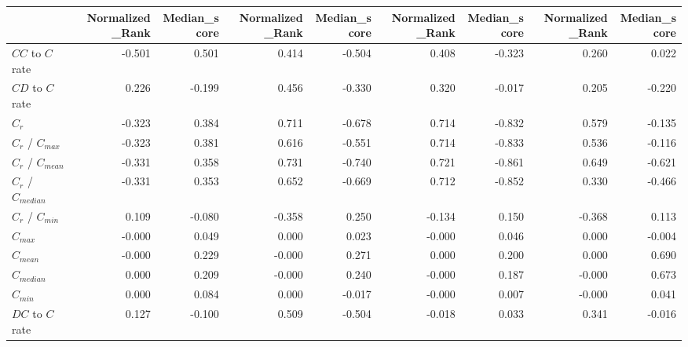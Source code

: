 \begin{tabular}{lrrrrrrrr}
\toprule
{} &  Normalized_Rank &  Median_score &  Normalized_Rank &  Median_score &  Normalized_Rank &  Median_score &  Normalized_Rank &  Median_score \\
\midrule
$CC$ to $C$ rate     &           -0.501 &         0.501 &            0.414 &        -0.504 &            0.408 &        -0.323 &            0.260 &         0.022 \\
$CD$ to $C$ rate     &            0.226 &        -0.199 &            0.456 &        -0.330 &            0.320 &        -0.017 &            0.205 &        -0.220 \\
$C_r$                &           -0.323 &         0.384 &            0.711 &        -0.678 &            0.714 &        -0.832 &            0.579 &        -0.135 \\
$C_r$ / $C_{max}$    &           -0.323 &         0.381 &            0.616 &        -0.551 &            0.714 &        -0.833 &            0.536 &        -0.116 \\
$C_r$ / $C_{mean}$   &           -0.331 &         0.358 &            0.731 &        -0.740 &            0.721 &        -0.861 &            0.649 &        -0.621 \\
$C_r$ / $C_{median}$ &           -0.331 &         0.353 &            0.652 &        -0.669 &            0.712 &        -0.852 &            0.330 &        -0.466 \\
$C_r$ / $C_{min}$    &            0.109 &        -0.080 &           -0.358 &         0.250 &           -0.134 &         0.150 &           -0.368 &         0.113 \\
$C_{max}$            &           -0.000 &         0.049 &            0.000 &         0.023 &           -0.000 &         0.046 &            0.000 &        -0.004 \\
$C_{mean}$           &           -0.000 &         0.229 &           -0.000 &         0.271 &            0.000 &         0.200 &            0.000 &         0.690 \\
$C_{median}$         &            0.000 &         0.209 &           -0.000 &         0.240 &           -0.000 &         0.187 &           -0.000 &         0.673 \\
$C_{min}$            &            0.000 &         0.084 &            0.000 &        -0.017 &           -0.000 &         0.007 &           -0.000 &         0.041 \\
$DC$ to $C$ rate     &            0.127 &        -0.100 &            0.509 &        -0.504 &           -0.018 &         0.033 &            0.341 &        -0.016 \\

\end{tabular}
